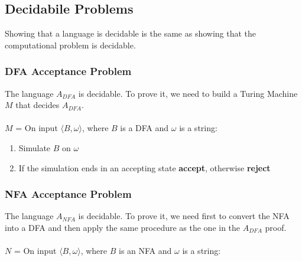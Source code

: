 \documentclass{article}
\begin{document}
\begin{center}
\end{center}

\subsection{Decidabile Problems}
Showing that a language is decidable is the same as showing that the computational problem is decidable.

\subsubsection{DFA Acceptance Problem}
The language $A_{DFA}$ is decidable. To prove it, we need to build a Turing Machine $M$ that decides $A_{DFA}$. \\ \\
$M$ = On input $\langle B, \omega\rangle$, where $B$ is a DFA and $\omega$ is a string:

\begin{enumerate}
	\item Simulate $B$ on $\omega$
	\item If the simulation ends in an accepting state \textbf{accept}, otherwise \textbf{reject}
\end{enumerate}

\subsubsection{NFA Acceptance Problem}
The language $A_{NFA}$ is decidable. To prove it, we need first to convert the NFA into a DFA and then apply the same procedure as the one in the $A_{DFA}$ proof. \\ \\
$N$ = On input $\langle B, \omega \rangle$, where $B$ is an NFA and $\omega$ is a string:
\end{document}
